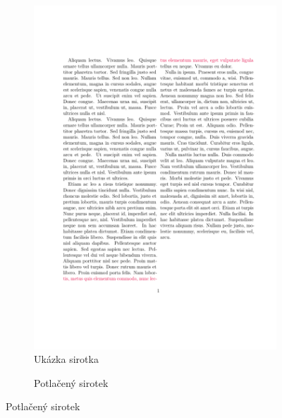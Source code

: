 \documentclass{csbulletin}
\begin{document}
  \begin{figure}[htbp]
\begin{subfigure}[t]{0.48\textwidth}
  \caption{Ukázka sirotka}
  \label{fig:widow}
  \begin{center}
    \includegraphics[width=\textwidth,page=1]{examples/widow.pdf}
  \end{center}
\end{subfigure}
\hfill
\begin{subfigure}[t]{0.48\textwidth}
  \caption{Potlačený sirotek}
  \begin{center}

\end{center}
\end{subfigure}
\end{figure}
\end{document}
